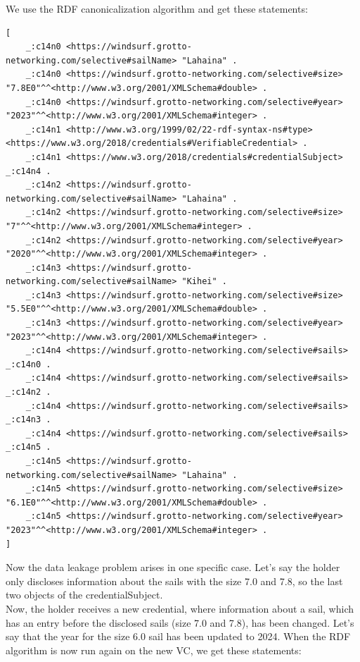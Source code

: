 \documentclass[
	a4paper               %
	,bibliography=totoc   %
	,listof=totoc         %
	,monolingual
	twoside=false,
]{bfhthesis}              %
\begin{document}
We use the RDF canonicalization algorithm and get these statements:

\begin{lstlisting}[language=canon,firstnumber=1,caption={Example: Sails VC as statements},captionpos=b]
[
	_:c14n0 <https://windsurf.grotto-networking.com/selective#sailName> "Lahaina" .
	_:c14n0 <https://windsurf.grotto-networking.com/selective#size> "7.8E0"^^<http://www.w3.org/2001/XMLSchema#double> .
	_:c14n0 <https://windsurf.grotto-networking.com/selective#year> "2023"^^<http://www.w3.org/2001/XMLSchema#integer> .
	_:c14n1 <http://www.w3.org/1999/02/22-rdf-syntax-ns#type> <https://www.w3.org/2018/credentials#VerifiableCredential> .
	_:c14n1 <https://www.w3.org/2018/credentials#credentialSubject> _:c14n4 .
	_:c14n2 <https://windsurf.grotto-networking.com/selective#sailName> "Lahaina" .
	_:c14n2 <https://windsurf.grotto-networking.com/selective#size> "7"^^<http://www.w3.org/2001/XMLSchema#integer> .
	_:c14n2 <https://windsurf.grotto-networking.com/selective#year> "2020"^^<http://www.w3.org/2001/XMLSchema#integer> .
	_:c14n3 <https://windsurf.grotto-networking.com/selective#sailName> "Kihei" .
	_:c14n3 <https://windsurf.grotto-networking.com/selective#size> "5.5E0"^^<http://www.w3.org/2001/XMLSchema#double> .
	_:c14n3 <https://windsurf.grotto-networking.com/selective#year> "2023"^^<http://www.w3.org/2001/XMLSchema#integer> .
	_:c14n4 <https://windsurf.grotto-networking.com/selective#sails> _:c14n0 .
	_:c14n4 <https://windsurf.grotto-networking.com/selective#sails> _:c14n2 .
	_:c14n4 <https://windsurf.grotto-networking.com/selective#sails> _:c14n3 .
	_:c14n4 <https://windsurf.grotto-networking.com/selective#sails> _:c14n5 .
	_:c14n5 <https://windsurf.grotto-networking.com/selective#sailName> "Lahaina" .
	_:c14n5 <https://windsurf.grotto-networking.com/selective#size> "6.1E0"^^<http://www.w3.org/2001/XMLSchema#double> .
	_:c14n5 <https://windsurf.grotto-networking.com/selective#year> "2023"^^<http://www.w3.org/2001/XMLSchema#integer> .
]
\end{lstlisting}

Now the data leakage problem arises in one specific case.
Let's say the holder only discloses information about the sails with the size 7.0 and 7.8, so the last two objects of the credentialSubject.\\
Now, the holder receives a new credential, where information about a sail, which has an entry before the disclosed sails (size 7.0 and 7.8), has been changed.
Let's say that the year for the size 6.0 sail has been updated to 2024.
When the RDF algorithm is now run again on the new VC, we get these statements:
\end{document}

